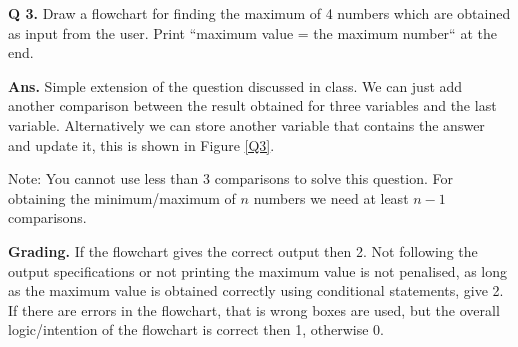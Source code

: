 \documentclass{article}
\begin{document}
\clearpage

\begin{flushleft}

\textbf{Q 3.} Draw a flowchart for finding the maximum of 4 numbers which are 
obtained as input from the user. Print “maximum value = \textlangle the maximum number\textrangle“ 
at the end.

\end{flushleft}

\begin{flushleft}

\textbf{Ans. } Simple extension of the question discussed in class.
We can just add another comparison between the result obtained for three variables and
the last variable. Alternatively we can store another variable that contains the answer
and update it, this is shown in Figure \ref{Q3}.

Note: You cannot use less than 3 comparisons to solve this question. For obtaining the
minimum/maximum of $n$ numbers we need at least $n-1$ comparisons. 

\end{flushleft}

\begin{flushleft}

\textbf{Grading. } If the flowchart gives the correct output then 2. Not following
the output specifications or not printing the maximum value is not penalised,
as long as the maximum value is obtained correctly using conditional statements,
give 2. If there are errors in the flowchart, that is wrong boxes are used, but the
overall logic/intention of the flowchart is correct then 1, otherwise 0.
        
\end{flushleft}
\end{document}
